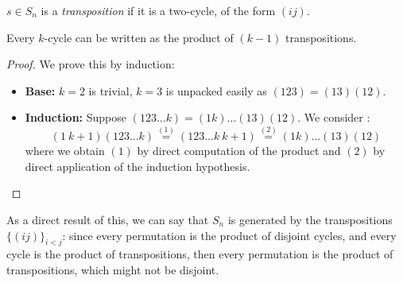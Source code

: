 \begin{definition}
  $s \in S_n$ is a \emph{transposition} if it is a two-cycle, of the form $(ij)$.
\end{definition}
\begin{theorem*}
  Every $k$-cycle can be written as the product of $(k - 1)$ transpositions. 
\end{theorem*}
\begin{proof}
  We prove this by induction:
  \begin{itemize}
    \item[] \textbf{Base:} $k = 2$ is trivial, $k = 3$ is unpacked easily as $(123) = (13)(12)$. 
    \item[] \textbf{Induction:} Suppose $(123...k) = (1k)...(13)(12)$. We consider : 
    \[
      (1\ k + 1)(123...k) \stackrel{(1)}{=} (123...k\ k + 1) \stackrel{(2)}{=} (1k)...(13)(12)
    \]
    where we obtain $(1)$ by direct computation of the product and $(2)$ by direct application of the induction hypothesis.
  \end{itemize}
\end{proof}

As a direct result of this, we can say that $S_n$ is generated by the transpositions $\{(ij)\}_{i < j}$: since every permutation is the product of disjoint cycles, and every cycle is the product of transpositions, then every permutation is the product of transpositions, which might not be disjoint.

